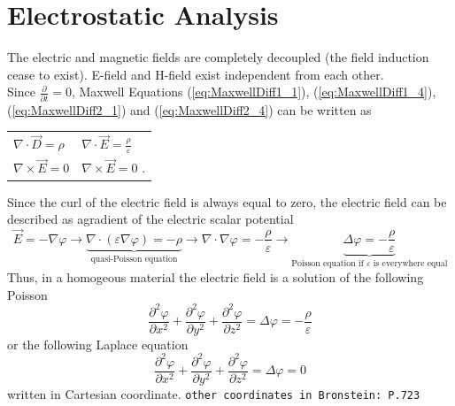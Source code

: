 \section{Electrostatic Analysis}

The electric and magnetic fields are completely decoupled (the field induction cease to exist). E-field and H-field exist independent from each other. \\

Since $\frac{\partial}{\partial t} = 0$, Maxwell Equations (\ref{eq:MaxwellDiff1_1}), (\ref{eq:MaxwellDiff1_4}), (\ref{eq:MaxwellDiff2_1}) and (\ref{eq:MaxwellDiff2_4}) can be written as

\begin{tabular}{ll}
	\(\displaystyle \nabla \cdot \vec{D} = \rho \) & \(\displaystyle \nabla \cdot \vec{E} = \frac{\rho}{\varepsilon} \) \\
	\(\displaystyle \nabla \times \vec{E} = 0 \) \hspace{2cm} & \(\displaystyle \nabla \times \vec{E} = 0 \) .
\end{tabular}

Since the curl of the electric field is always equal to zero, the electric field can be described as agradient of the electric scalar potential
\begin{equation*}
	\vec{E} = -\nabla \varphi \rightarrow \underbrace{\nabla \cdot \left(\varepsilon \nabla \varphi\right) = -\rho}_{\text{quasi-Poisson equation}} \rightarrow \nabla \cdot \nabla \varphi = -\frac{\rho}{\varepsilon} \rightarrow \underbrace{\Delta \varphi = -\frac{\rho}{\varepsilon}}_{\text{Poisson equation if $\varepsilon$ is everywhere equal}}
\end{equation*}
Thus, in a homogeous material the electric field is a solution of the following Poisson
\begin{equation*}
	\frac{\partial^2 \varphi}{\partial x^2} + \frac{\partial^2 \varphi}{\partial y^2} +\frac{\partial^2 \varphi}{\partial z^2} = \Delta \varphi = - \frac{\rho}{\varepsilon}
\end{equation*}
or the following Laplace equation
\begin{equation*}
	\frac{\partial^2 \varphi}{\partial x^2} + \frac{\partial^2 \varphi}{\partial y^2} +\frac{\partial^2 \varphi}{\partial z^2} = \Delta \varphi = 0
\end{equation*}
written in Cartesian coordinate. {\tiny \texttt{other coordinates in Bronstein: P.723}}

